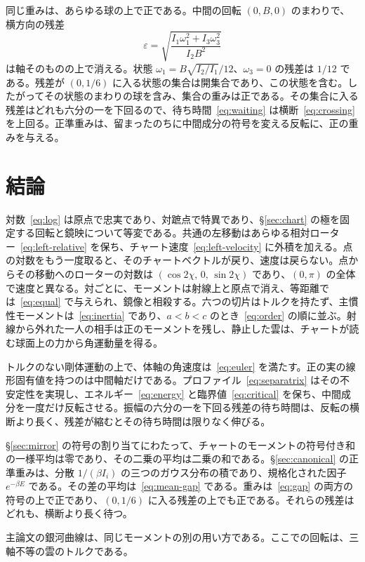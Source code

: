 \documentclass[a4paper]{article}
\begin{document}
同じ重みは、あらゆる球の上で正である。中間の回転 \((0,B,0)\) のまわりで、横方向の残差
\[
\varepsilon=\sqrt{\frac{I_1\omega_1^2+I_3\omega_3^2}{I_2 B^2}}
\]
は軸そのものの上で消える。状態 \(\omega_1=B\sqrt{I_2/I_1}/12\)、\(\omega_3=0\) の残差は \(1/12\) である。残差が \((0,1/6)\) に入る状態の集合は開集合であり、この状態を含む。したがってその状態のまわりの球を含み、集合の重みは正である。その集合に入る残差はどれも六分の一を下回るので、待ち時間~\eqref{eq:waiting} は横断~\eqref{eq:crossing} を上回る。正準重みは、留まったのちに中間成分の符号を変える反転に、正の重みを与える。

\section{結論}

対数~\eqref{eq:log} は原点で忠実であり、対蹠点で特異であり、\S\ref{sec:chart} の極を固定する回転と鏡映について等変である。共通の左移動はあらゆる相対ローター~\eqref{eq:left-relative} を保ち、チャート速度~\eqref{eq:left-velocity} に外積を加える。点の対数をもう一度取ると、そのチャートベクトルが戻り、速度は戻らない。点からその移動へのローターの対数は \((\cos 2\chi,\,0,\,\sin 2\chi)\) であり、\((0,\pi)\) の全体で速度と異なる。対ごとに、モーメントは射線上と原点で消え、等距離では~\eqref{eq:equal} で与えられ、鏡像と相殺する。六つの切片はトルクを持たず、主慣性モーメントは~\eqref{eq:inertia} であり、\(a<b<c\) のとき~\eqref{eq:order} の順に並ぶ。射線から外れた一人の相手は正のモーメントを残し、静止した雲は、チャートが読む球面上の力から角運動量を得る。

トルクのない剛体運動の上で、体軸の角速度は~\eqref{eq:euler} を満たす。正の実の線形固有値を持つのは中間軸だけである。プロファイル~\eqref{eq:separatrix} はその不安定性を実現し、エネルギー~\eqref{eq:energy} と臨界値~\eqref{eq:critical} を保ち、中間成分を一度だけ反転させる。振幅の六分の一を下回る残差の待ち時間は、反転の横断より長く、残差が縮むとその待ち時間は限りなく伸びる。

\S\ref{sec:mirror} の符号の割り当てにわたって、チャートのモーメントの符号付き和の一様平均は零であり、その二乗の平均は二乗の和である。\S\ref{sec:canonical} の正準重みは、分散 \(1/(\beta I_i)\) の三つのガウス分布の積であり、規格化された因子 \(e^{-\beta E}\) である。その差の平均は~\eqref{eq:mean-gap} である。重みは~\eqref{eq:gap} の両方の符号の上で正であり、\((0,1/6)\) に入る残差の上でも正である。それらの残差はどれも、横断より長く待つ。

主論文の銀河曲線は、同じモーメントの別の用い方である。ここでの回転は、三軸不等の雲のトルクである。
\end{document}
